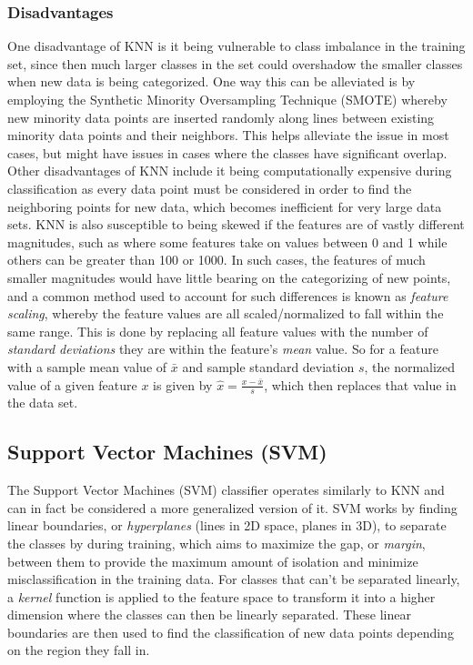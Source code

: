 \documentclass[journal,twocolumn,12pt,twoside]{IEEEtran}
\begin{document}
\subsubsection{Disadvantages}
One disadvantage of KNN is it being vulnerable to class imbalance in the training set, since then much larger classes in the set could overshadow the smaller classes when new data is being categorized. One way this can be alleviated is by employing the Synthetic Minority Oversampling Technique (SMOTE) whereby new minority data points are inserted randomly along lines between existing minority data points and their neighbors. This helps alleviate the issue in most cases, but might have issues in cases where the classes have significant overlap. Other disadvantages of KNN include it being computationally expensive during classification as every data point must be considered in order to find the neighboring points for new data, which becomes inefficient for very large data sets. KNN is also susceptible to being skewed if the features are of vastly different magnitudes, such as where some features take on values between 0 and 1 while others can be greater than 100 or 1000. In such cases, the features of much smaller magnitudes would have little bearing on the categorizing of new points, and a common method used to account for such differences is known as \textit{feature scaling}, whereby the feature values are all scaled/normalized to fall within the same range. This is done by replacing all feature values with the number of \textit{standard deviations} they are within the feature's \textit{mean} value. So for a feature with a sample mean value of $\bar{x}$ and sample standard deviation $s$, the normalized value of a given feature $x$ is given by
$\hat{x} = \frac{x - \bar{x}}{s}$,
which then replaces that value in the data set.
\subsection{Support Vector Machines (SVM)}
The Support Vector Machines (SVM) classifier operates similarly to KNN and can in fact be considered a more generalized version of it. SVM works by finding linear boundaries, or \textit{hyperplanes} (lines in 2D space, planes in 3D), to separate the classes by during training, which aims to maximize the gap, or \textit{margin}, between them to provide the maximum amount of isolation and minimize misclassification in the training data. For classes that can't be separated linearly, a \textit{kernel} function is applied to the feature space to transform it into a higher dimension where the classes can then be linearly separated. These linear boundaries are then used to find the classification of new data points depending on the region they fall in.
\end{document}
